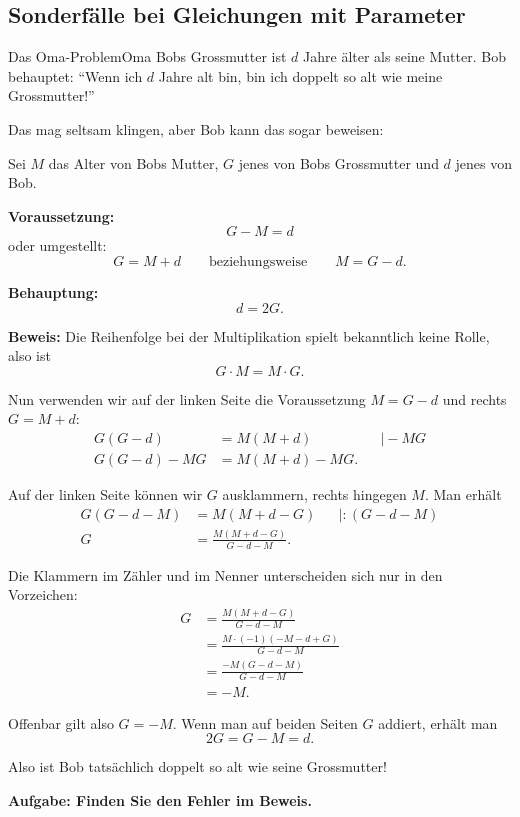 \subsection{Sonderfälle bei Gleichungen mit Parameter}
\begin{LA}
    {Das Oma-Problem}{Oma}
    Bobs Grossmutter ist \(d\) Jahre älter als seine Mutter. Bob behauptet: ``Wenn ich \(d\) Jahre alt bin, bin ich doppelt so alt wie meine Grossmutter!''

    Das mag seltsam klingen, aber Bob kann das sogar beweisen:

    Sei \(M\) das Alter von Bobs Mutter, \(G\) jenes von Bobs Grossmutter und \(d\) jenes von Bob.

    \textbf{Voraussetzung:}
    \[
        G-M=d
    \]
    oder umgestellt:
    \[
        G=M+d
        \qquad\text{beziehungsweise}\qquad
        M=G-d.
    \]

    \textbf{Behauptung:}
    \[
        d=2G.
    \]

    \textbf{Beweis:}
    Die Reihenfolge bei der Multiplikation spielt bekanntlich keine Rolle, also ist
    \[
        G\cdot M=M\cdot G.
    \]

    Nun verwenden wir auf der linken Seite die Voraussetzung \(M=G-d\) und rechts \(G=M+d\):
    \[
        \begin{aligned}
            G(G-d)    & = M(M+d)     &  & \mid -MG \\
            G(G-d)-MG & = M(M+d)-MG.
        \end{aligned}
    \]

    Auf der linken Seite können wir \(G\) ausklammern, rechts hingegen \(M\). Man erhält
    \[
        \begin{aligned}
            G(G-d-M) & = M(M+d-G)
                     &                           & \mid :(G-d-M) \\
            G        & = \frac{M(M+d-G)}{G-d-M}.
        \end{aligned}
    \]

    Die Klammern im Zähler und im Nenner unterscheiden sich nur in den Vorzeichen:
    \[
        \begin{aligned}
            G
             & =\frac{M(M+d-G)}{G-d-M}           \\
             & =\frac{M\cdot(-1)(-M-d+G)}{G-d-M} \\
             & =\frac{-M(G-d-M)}{G-d-M}          \\
             & =-M.
        \end{aligned}
    \]

    Offenbar gilt also
    \(
    G=-M.
    \)
    Wenn man auf beiden Seiten \(G\) addiert, erhält man
    \[
        2G=G-M=d.
    \]

    Also ist Bob tatsächlich doppelt so alt wie seine Grossmutter!

    \bigskip

    \textbf{Aufgabe: Finden Sie den Fehler im Beweis.}
\end{LA}







